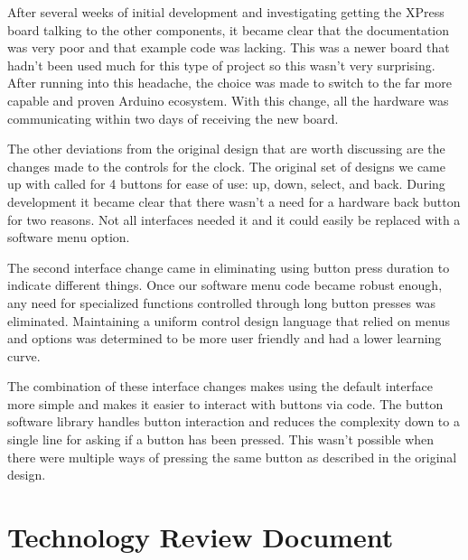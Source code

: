 \documentclass[onecolumn, draftclsnofoot,10pt, compsoc]{IEEEtran}
\begin{document}
After several weeks of initial development and investigating getting the XPress board talking to the other components, it became clear that the documentation was very poor and that example code was lacking. This was a newer board that hadn’t been used much for this type of project so this wasn’t very surprising. After running into this headache, the choice was made to switch to the far more capable and proven Arduino ecosystem. With this change, all the hardware was communicating within two days of receiving the new board.

The other deviations from the original design that are worth discussing are the changes made to the controls for the clock. The original set of designs we came up with called for 4 buttons for ease of use: up, down, select, and back. During development it became clear that there wasn’t a need for a hardware back button for two reasons. Not all interfaces needed it and it could easily be replaced with a software menu option.

The second interface change came in eliminating using button press duration to indicate different things. Once our software menu code became robust enough, any need for specialized functions controlled through long button presses was eliminated. Maintaining a uniform control design language that relied on menus and options was determined to be more user friendly and had a lower learning curve.

The combination of these interface changes makes using the default interface more simple and makes it easier to interact with buttons via code. The button software library handles button interaction and reduces the complexity down to a single line for asking if a button has been pressed. This wasn’t possible when there were multiple ways of pressing the same button as described in the original design.


\section{Technology Review Document}
\end{document}
